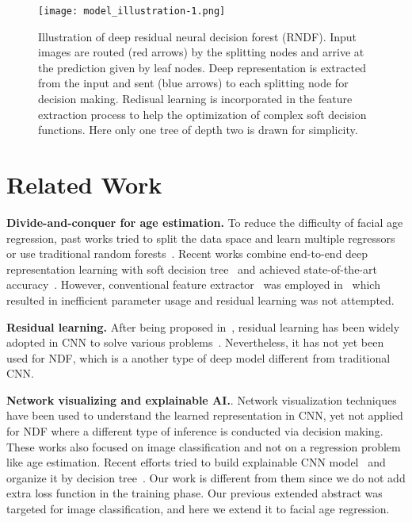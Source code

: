 \documentclass{bmvc2k}
\begin{document}
\begin{figure*}
	\begin{center}
		\texttt{[image: model\_illustration-1.png]}
	\end{center}
	\caption{Illustration of deep residual neural decision forest (RNDF). Input images are routed (red arrows) by the splitting nodes and arrive at the prediction given by leaf nodes. Deep representation is extracted from the input and sent (blue arrows) to each splitting node for decision making. Redisual learning is incorporated in the feature extraction process to help the optimization of complex soft decision functions. Here only one tree of depth two is drawn for simplicity.}
	\label{idea}
\end{figure*}








\section{Related Work}
\textbf{Divide-and-conquer for age estimation.} To reduce the difficulty of facial age regression, past works tried to split the data space and learn multiple regressors~\cite{HumanPerform} or use traditional random forests~\cite{randomforest}. Recent works combine end-to-end deep representation learning with soft decision tree~\cite{NDF,Depth,DRFs} and achieved state-of-the-art accuracy~\cite{DRFs}. However, conventional feature extractor~\cite{VGG} was employed in~\cite{DRFs} which resulted in inefficient parameter usage and residual learning was not attempted. 

\textbf{Residual learning.} After being proposed in~\cite{resnet}, residual learning has been widely adopted in CNN to solve various problems~\cite{resdenoise,VQA,H_module}. Nevertheless, it has not yet been used for NDF, which is a another type of deep model different from traditional CNN.

\textbf{Network visualizing and explainable AI.}. Network visualization techniques~\cite{saliency, invert} have been used to understand the learned representation in CNN, yet not applied for NDF where a different type of inference is conducted via decision making. These works also focused on image classification and not on a regression problem like age estimation. Recent efforts tried to build explainable CNN model~\cite{interpret} and organize it by decision tree~\cite{inter_tree}. Our work is different from them since we do not add extra loss function in the training phase. Our previous extended abstract \cite{li2019visualizing} was targeted for image classification, and here we extend it to facial age regression. 
\end{document}
